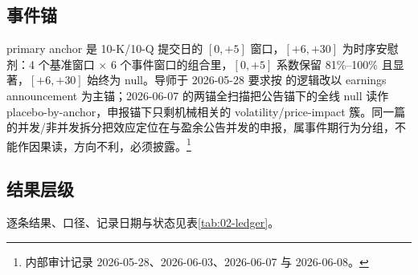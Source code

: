 \documentclass[a4paper,11pt]{ctexart}
\begin{document}
\subsection{事件锚}\label{sec:02-anchor}

primary anchor 是 10-K/10-Q 提交日的 $[0,+5]$ 窗口，$[+6,+30]$ 为时序安慰剂：4 个基准窗口 $\times$ 6 个事件窗口的组合里，$[0,+5]$ 系数保留 81\%--100\% 且显著，$[+6,+30]$ 始终为 null。导师于 2026-05-28 要求按 \citet{liramesh2009} 的逻辑改以 earnings announcement 为主锚；2026-06-07 的两锚全扫描把公告锚下的全线 null 读作 placebo-by-anchor，申报锚下只剩机械相关的 volatility/price-impact 簇。同一篇的并发/非并发拆分把效应定位在与盈余公告并发的申报，属事件期行为分组，不能作因果读，方向不利，必须披露。\footnote{内部审计记录 2026-05-28、2026-06-03、2026-06-07 与 2026-06-08。}

\subsection{结果层级}\label{sec:02-ledger}

逐条结果、口径、记录日期与状态见表\ref{tab:02-ledger}。
\end{document}

